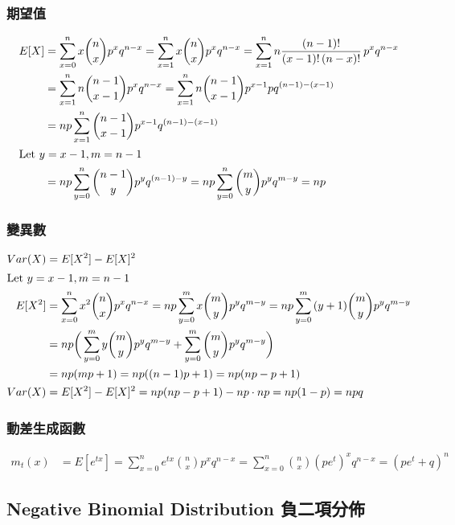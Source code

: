 \documentclass{article}
\begin{document}
\subsubsection{期望值}
\begin{align*}
E[X]
& = \sum_{x=0}^n{x\binom{n}{x}p^x q^{n-x}}
  = \sum_{x=1}^n{x\binom{n}{x}p^x q^{n-x}}
  = \sum_{x=1}^n{n\frac{(n-1)!}{(x-1)!\,(n-x)!}\,p^x q^{n-x}} \\
& = \sum_{x=1}^n{n\binom{n-1}{x-1}p^x q^{n-x}}
  = \sum_{x=1}^n{n\binom{n-1}{x-1}p^{x-1}p q^{(n-1)-(x-1)}} \\
& = np\sum_{x=1}^n{\binom{n-1}{x-1}p^{x-1} q^{(n-1)-(x-1)}} \\
\intertext{Let \( y = x-1, m = n-1 \)}
& = np\sum_{y=0}^n{\binom{n-1}{y}p^y q^{(n-1)-y}}
  = np\sum_{y=0}^n{\binom{m}{y}p^y q^{m-y}}
  = np
\end{align*}

\subsubsection{變異數}
\begin{align*}
Var(X)
& = E[X^2]-E[X]^2 \\
\intertext{Let \( y = x-1, m = n-1 \)}
E[X^2] & = \sum_{x=0}^n{x^2\binom{n}{x}p^x q^{n-x}}
  = np\sum_{y=0}^m{x\binom{m}{y}p^y q^{m-y}}
  = np\sum_{y=0}^m{(y+1)\binom{m}{y}p^y q^{m-y}} \\
& = np\bigg(
    \sum_{y=0}^m{y\binom{m}{y}p^y q^{m-y}} +
    \sum_{y=0}^m{\binom{m}{y}p^y q^{m-y}}\bigg) \\
& = np(mp+1)
  = np((n-1)p+1)
  = np(np-p+1) \\
Var(X) & = E[X^2]-E[X]^2
  = np(np-p+1)-np\cdot np
  = np(1-p)
  = npq
\end{align*}

\subsubsection{動差生成函數}
\begin{align*}
m_t(x) & = E[e^{tx}]
  = \sum_{x=0}^n{e^{tx}\binom{n}{x}p^x q^{n-x}}
  = \sum_{x=0}^n{\binom{n}{x}(pe^t)^x q^{n-x}}
  = (pe^t+q)^n
\end{align*}

\bigskip
\subsection{Negative Binomial Distribution 負二項分佈}

\bigskip
\end{document}
